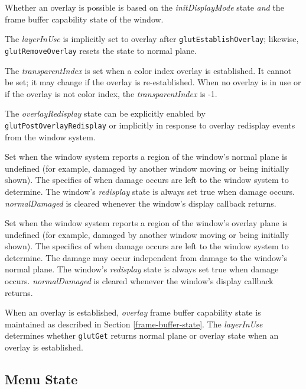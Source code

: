 {\footnotesize
\begin{description}
\itemsep 0in
\item[\takeNote]  Whether an overlay is possible is based on the {\em initDisplayMode} state {\em
   and} the frame buffer capability state of the window.
\item[\takeNote]  The {\em layerInUse} is implicitly set to overlay after {\tt glutEstablishOverlay};
  likewise, {\tt glutRemoveOverlay} resets the state to normal plane.
\item[\takeNote]  The {\em transparentIndex} is set when a color index overlay is established.  It
   cannot be set; it may change if the overlay is re-established.  When no overlay is in use
   or if the overlay is not color index, the {\em transparentIndex} is -1.
\item[\takeNote]  The {\em overlayRedisplay} state can be explicitly enabled by {\tt glutPostOverlayRedisplay}
   or implicitly in response to overlay redisplay events from the window system.
\item[\takeNote]  Set when the window system reports a region of the window's normal plane
   is undefined (for example, damaged by another window moving or being initially shown).
   The specifics of when damage occurs are left to the window system to determine.
   The window's {\em redisplay} state is always set true when damage occurs.  {\em normalDamaged}
   is cleared whenever the window's display callback returns.
\item[\takeNote]  Set when the window system reports a region of the window's overlay plane
   is undefined (for example, damaged by another window moving or being initially shown).
   The specifics of when damage occurs are left to the window system to determine.  The
   damage may occur independent from damage to the window's normal plane.
   The window's {\em redisplay} state is always set true when damage occurs.  {\em normalDamaged}
   is cleared whenever the window's display callback returns.
\end{description}
}

When an overlay is established, {\em overlay} frame buffer capability state is maintained
as described in Section \ref{frame-buffer-state}.  The {\em layerInUse} determines
whether {\tt glutGet} returns normal plane or overlay state when an overlay is
established.

\subsection{Menu State}

